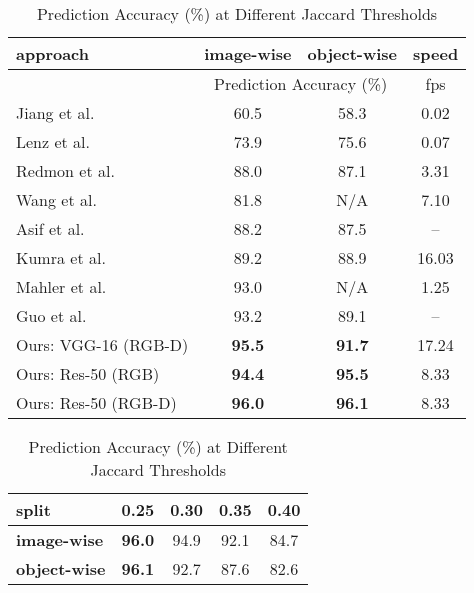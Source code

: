 \documentclass[letterpaper, 10 pt, journal, twoside]{IEEEtran}
\begin{document}
\begin {table}[t]
  \centering
\caption {Single-Object Single-Grasp Evaluation  }
  \small
  \begin{tabular}{ | l | c | c | c |}
    \hline
    {\bf approach} & \bf{image-wise} & \bf{object-wise} & \bf{speed} \\ \hline
                  & \multicolumn{2}{c|}{Prediction Accuracy (\%)} & fps \\ \hline
    
    Jiang et al. \cite{jiang2011efficient}  & 60.5 & 58.3 & 0.02  \\ \hline
    Lenz et al.  \cite{lenz2015deep}        & 73.9 & 75.6 & 0.07    \\ \hline
    Redmon et al. \cite{redmon2015real}     & 88.0 & 87.1 & 3.31  \\ \hline
    Wang et al. \cite{wang2016robot}	    & 81.8 & N/A  & 7.10  \\ \hline
    Asif et al.	\cite{asif2017rgb}          & 88.2 & 87.5 & --    \\ \hline
    Kumra et al.	\cite{kumra2016robotic} & 89.2 & 88.9 & 16.03 \\ \hline
    Mahler et al. \cite{MaEtAl_RSS[2017]}   & 93.0 & N/A  & 1.25  \\ \hline
    Guo et al. \cite{GuEtAl_ICRA2017}     & 93.2 & 89.1 & --    \\
    \hline \hline 
    Ours: VGG-16	 (RGB-D)                       & \bf{95.5} & \bf{91.7} & 17.24 \\ 
    \hline 
    Ours: Res-50 (RGB)                   & \bf{94.4} & \bf{95.5} & 8.33 \\ 
    \hline 
    Ours: Res-50 (RGB-D)                        & \bf{96.0} & \bf{96.1} & 8.33 \\ 

    \hline
  \end{tabular}
  \vspace*{0.25ex}
  \caption {Prediction Accuracy (\%) at Different Jaccard Thresholds 
  }
  \begin{tabular}{ | l | c | c | c | c| }
    \hline
    \bf{split} & 0.25 & 0.30 & 0.35 & 0.40 \\ \hline
    
    \bf{image-wise}   &  \bf{96.0}  &  94.9  & 92.1  & 84.7 \\ \hline
    \bf{object-wise}  &  \bf{96.1}  &  92.7  & 87.6  & 82.6 \\ 
    \hline
  \end{tabular}
  \vspace*{-0.075in}
\end {table}
\end{document}
